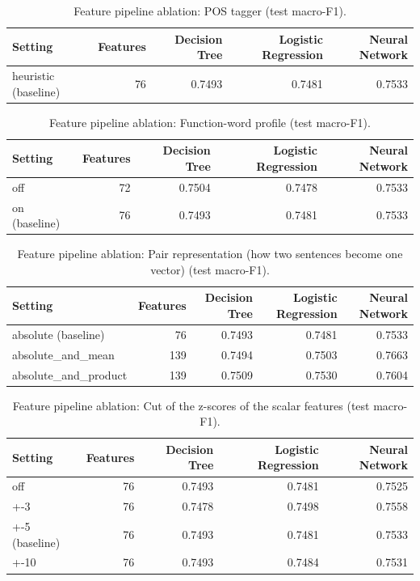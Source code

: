 \begin{table}[ht]
\centering
\small
\caption{Feature pipeline ablation: POS tagger (test macro-F1).}
\label{tab:pipeline-pos-tagger}
\begin{tabular}{lrrrr}
\toprule
Setting & Features & Decision Tree & Logistic Regression & Neural Network \\
\midrule
heuristic (baseline) & 76 & 0.7493 & 0.7481 & 0.7533 \\
\bottomrule
\end{tabular}
\end{table}

\begin{table}[ht]
\centering
\small
\caption{Feature pipeline ablation: Function-word profile (test macro-F1).}
\label{tab:pipeline-function-words}
\begin{tabular}{lrrrr}
\toprule
Setting & Features & Decision Tree & Logistic Regression & Neural Network \\
\midrule
off & 72 & 0.7504 & 0.7478 & 0.7533 \\
on (baseline) & 76 & 0.7493 & 0.7481 & 0.7533 \\
\bottomrule
\end{tabular}
\end{table}

\begin{table}[ht]
\centering
\small
\caption{Feature pipeline ablation: Pair representation (how two sentences become one vector) (test macro-F1).}
\label{tab:pipeline-pair-representation}
\begin{tabular}{lrrrr}
\toprule
Setting & Features & Decision Tree & Logistic Regression & Neural Network \\
\midrule
absolute (baseline) & 76 & 0.7493 & 0.7481 & 0.7533 \\
absolute\_and\_mean & 139 & 0.7494 & 0.7503 & 0.7663 \\
absolute\_and\_product & 139 & 0.7509 & 0.7530 & 0.7604 \\
\bottomrule
\end{tabular}
\end{table}

\begin{table}[ht]
\centering
\small
\caption{Feature pipeline ablation: Cut of the z-scores of the scalar features (test macro-F1).}
\label{tab:pipeline-z-clip}
\begin{tabular}{lrrrr}
\toprule
Setting & Features & Decision Tree & Logistic Regression & Neural Network \\
\midrule
off & 76 & 0.7493 & 0.7481 & 0.7525 \\
+-3 & 76 & 0.7478 & 0.7498 & 0.7558 \\
+-5 (baseline) & 76 & 0.7493 & 0.7481 & 0.7533 \\
+-10 & 76 & 0.7493 & 0.7484 & 0.7531 \\
\bottomrule
\end{tabular}
\end{table}

